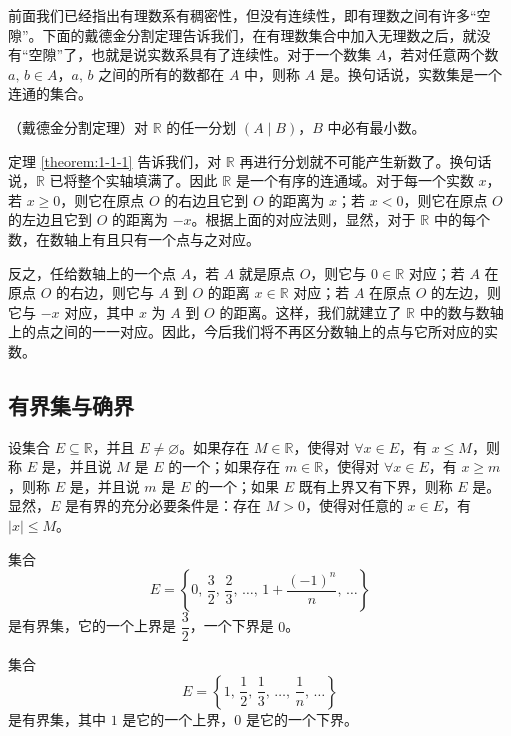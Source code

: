 \documentclass[UTF8,12pt,a4paper,fontset=fandol]{ctexbook}
\begin{document}
前面我们已经指出有理数系有稠密性，但没有连续性，即有理数之间有许多“空隙”。下面的戴德金分割定理告诉我们，在有理数集合中加入无理数之后，就没有“空隙”了，也就是说实数系具有了连续性。对于一个数集 $A$，若对任意两个数 $a,\,b\in A$，$a,\,b$ 之间的所有的数都在 $A$ 中，则称 $A$ 是。换句话说，实数集是一个连通的集合。


\begin{theorem}\label{theorem:1-1-1}
（戴德金分割定理）对 $\mathbb{R}$ 的任一分划 $(A\mid B)$，$B$ 中必有最小数。
\end{theorem}


定理 \ref{theorem:1-1-1} 告诉我们，对 $\mathbb{R}$ 再进行分划就不可能产生新数了。换句话说，$\mathbb{R}$ 已将整个实轴填满了。因此 $\mathbb{R}$ 是一个有序的连通域。对于每一个实数 $x$，若 $x\geqslant 0$，则它在原点 $O$ 的右边且它到 $O$ 的距离为 $x$；若 $x<0$，则它在原点 $O$ 的左边且它到 $O$ 的距离为 $-x$。根据上面的对应法则，显然，对于 $\mathbb{R}$ 中的每个数，在数轴上有且只有一个点与之对应。


反之，任给数轴上的一个点 $A$，若 $A$ 就是原点 $O$，则它与 $0\in\mathbb{R}$ 对应；若 $A$ 在原点 $O$ 的右边，则它与 $A$ 到 $O$ 的距离 $x\in\mathbb{R}$ 对应；若 $A$ 在原点 $O$ 的左边，则它与 $-x$ 对应，其中 $x$ 为 $A$ 到 $O$ 的距离。这样，我们就建立了 $\mathbb{R}$ 中的数与数轴上的点之间的一一对应。因此，今后我们将不再区分数轴上的点与它所对应的实数。


\subsection{有界集与确界}
设集合 $E\subseteq\mathbb{R}$，并且 $E\ne\varnothing$。如果存在 $M\in\mathbb{R}$，使得对 $\forall x\in E$，有 $x\leqslant M$，则称 $E$ 是，并且说 $M$ 是 $E$ 的一个；如果存在 $m\in\mathbb{R}$，使得对 $\forall x\in E$，有 $x\geqslant m$，则称 $E$ 是，并且说 $m$ 是 $E$ 的一个；如果 $E$ 既有上界又有下界，则称 $E$ 是。显然，$E$ 是有界的充分必要条件是：存在 $M>0$，使得对任意的 $x\in E$，有 $|x|\leqslant M$。


\begin{example}
集合
\[
  E=\left\{0,\,\frac32,\,\frac23,\,\dots,\,1+\frac{(-1)^n}{n},\,\dots\right\}
\]
是有界集，它的一个上界是 $\dfrac32$，一个下界是 $0$。
\end{example}


\begin{example}
集合
\[
  E=\left\{1,\,\frac12,\,\frac13,\,\dots,\,\frac1n,\,\dots\right\}
\]
是有界集，其中 $1$ 是它的一个上界，$0$ 是它的一个下界。
\end{example}
\end{document}

